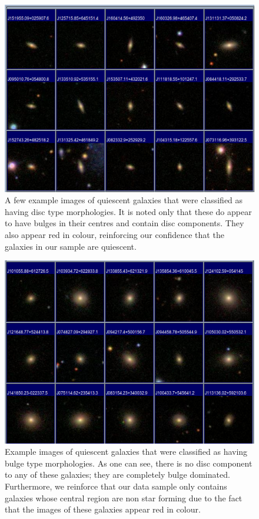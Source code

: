 \documentclass[showcase, preprintnumbers, amsmath, amssymb, bibnotes, 12pt]{revtex4}
\begin{document}
\begin{figure}
\begin{center}
\includegraphics[scale=0.73]{disk.png}
\end{center}
\caption{A few example images of quiescent galaxies that were classified as having disc type morphologies. It is noted only that these do appear to have bulges in their centres and contain disc components.  They also appear red in colour, reinforcing our confidence that the galaxies in our sample are quiescent. \label{fig:disk}} 
\end{figure}


\begin{figure}
\begin{center}
\includegraphics[scale=0.73]{bulge.png}
\end{center}
\caption{Example images of quiescent galaxies that were classified as having bulge type morphologies. As one can see, there is no disc component to any of these galaxies; they are completely bulge dominated. Furthermore, we reinforce that our data sample only contains galaxies whose central region are non star forming due to the fact that the images of these galaxies appear red in colour. \label{fig:bulge}} 
\end{figure}
\end{document}
